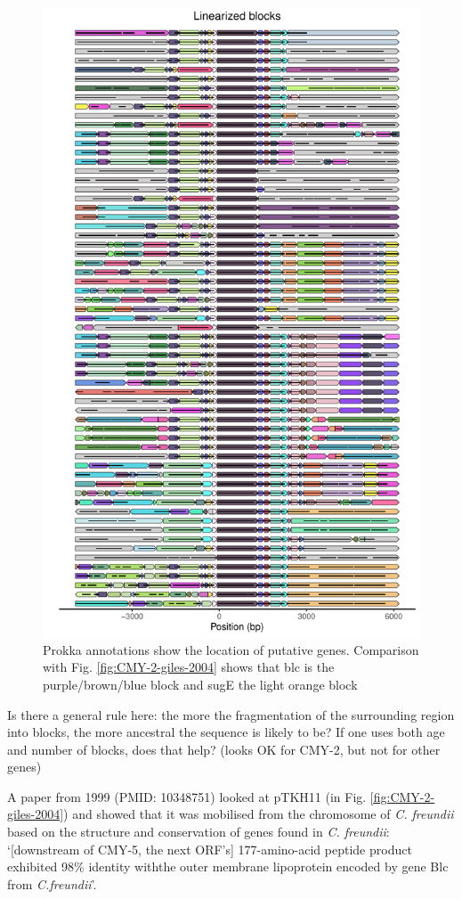 \documentclass[aps,rmp,preprint,superscriptaddress,10pt,twocolumn]{revtex4-1}
\begin{document}
\begin{figure}
    \centering
\includegraphics[width=0.8\linewidth]{figs/CMY-prokka.pdf}
    \caption{Prokka annotations show the location of putative genes. Comparison with Fig. \ref{fig:CMY-2-giles-2004} shows that blc is the purple/brown/blue block and sugE the light orange block}
    \label{fig:CMY-2-prokka-annotations}
\end{figure}

Is there a general rule here: the more the fragmentation of the surrounding region into blocks, the more ancestral the sequence is likely to be? If one uses both age and number of blocks, does that help? (looks OK for CMY-2, but not for other genes)

A paper from 1999 (PMID: 10348751) looked at pTKH11 (in Fig. \ref{fig:CMY-2-giles-2004}) and showed that it was mobilised from the chromosome of \textit{C. freundii} based on the structure and conservation of genes found in \textit{C. freundii}: `[downstream of CMY-5, the next ORF's] 177-amino-acid  peptide product  exhibited  98\%  identity  withthe outer membrane lipoprotein encoded by gene Blc from \textit{C.freundii}'. 
\end{document}
